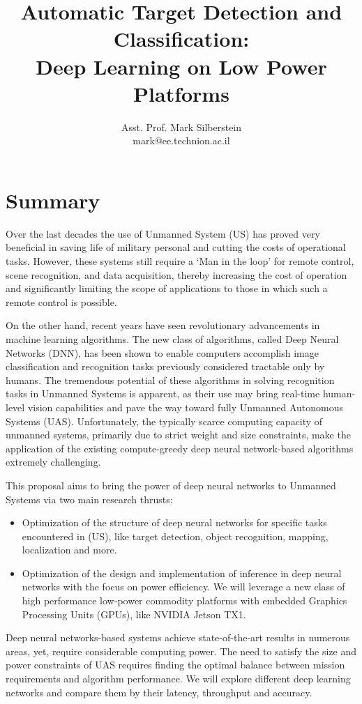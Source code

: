 \documentclass{article} %
\title{Automatic Target Detection and Classification: \\
  Deep Learning on Low Power Platforms}
\author{
  Asst. Prof. Mark Silberstein \\
  mark@ee.technion.ac.il\\
}
\begin{document}
\maketitle

\section{Summary}

Over the last decades the use of Unmanned System (US) has proved very beneficial
in saving life of military personal and cutting the costs of operational tasks.
However, these systems still require a `Man in the loop' for remote control,
scene recognition, and data acquisition, thereby increasing the cost of
operation and significantly limiting the scope of applications to those in which
such a remote control is possible.

On the other hand, recent years have seen revolutionary advancements in machine
learning algorithms. The new class of algorithms, called Deep Neural Networks
(DNN), has been shown to enable computers accomplish image classification and
recognition tasks previously considered tractable only by humans. The tremendous
potential of these algorithms in solving recognition tasks in Unmanned Systems
is apparent, as their use may bring real-time human-level vision capabilities
and pave the way toward fully Unmanned Autonomous Systems (UAS). Unfortunately,
the typically scarce computing capacity of unmanned systems, primarily due to
strict weight and size constraints, make the application of the existing
compute-greedy deep neural network-based algorithms extremely challenging.

This proposal aims to bring the power of deep neural networks to Unmanned
Systems via two main research thrusts:

\begin{itemize}
\item Optimization of the structure of deep neural networks for specific
	tasks encountered in (US), like target detection, object recognition,
	mapping, localization and more.
\item Optimization of the design and implementation of inference in deep neural
	networks with the focus on power efficiency. We will leverage a new  class of high
	performance low-power commodity platforms with embedded Graphics
	Processing Units (GPUs), like  NVIDIA Jetson TX1.
\end{itemize}

Deep neural networks-based systems achieve  state-of-the-art results in numerous
areas, yet, require considerable computing power. The need to satisfy the size and
power constraints of UAS requires finding the optimal balance between
mission requirements and algorithm performance. We will explore different
deep learning networks and compare them by their latency, throughput and
accuracy.
\end{document}
